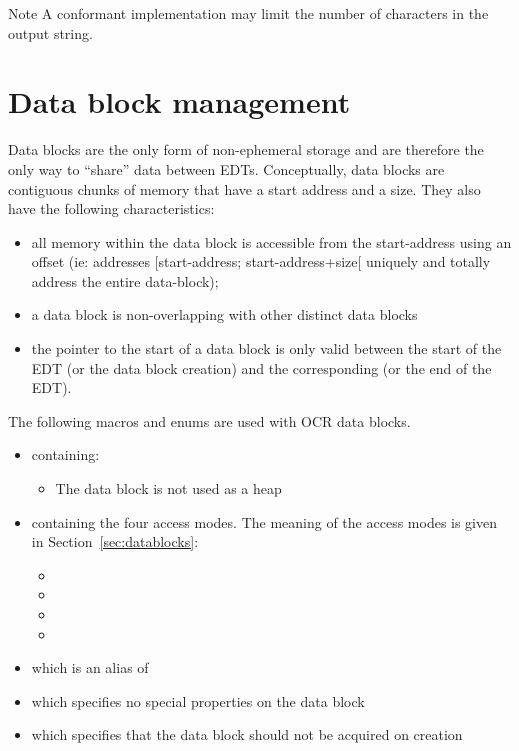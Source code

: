 \begin{DoxyNote}{Note}
A conformant implementation may limit the number of characters in the
output string.
\end{DoxyNote}
\section{Data block management}
\label{sec:OCRDataBlockManagement}

Data blocks are the only form of non-\/ephemeral storage and are therefore
the only way to ``share'' data between E\-D\-Ts. Conceptually, data blocks
are contiguous chunks of memory that have a start address and a size.
They also have the following characteristics\-:
\begin{itemize}
\item all memory within the data block is accessible from the start-\/address
  using an offset (ie\-: addresses \mbox{[}start-\/address; start-\/address+size\mbox{[}
  uniquely and totally address the entire data-\/block);
\item a data block is non-\/overlapping with other distinct data blocks
\item the pointer to the start of a data block is only valid between the start
of the E\-D\-T (or the data block creation) and the corresponding 
(or the end of the E\-D\-T).
\end{itemize}

The following macros and enums are used with OCR data blocks.
\begin{itemize}
\item \hypertarget{type_ocrInDbAllocator_t}{} containing:
  \begin{itemize}
  \item {} The data block is not used as a heap
  \end{itemize}
\item \hypertarget{type_ocrDbAccessMode_t}{}
  containing the four access modes. The
  meaning of the access modes is given in Section~\ref{sec:datablocks}:
  \begin{itemize}
    \item {}
    \item {}
    \item {}
    \item {}
  \end{itemize}
\item {} which is an alias of 
\item {} which specifies no special properties on the data block
\item {} which specifies that the data block should
  not be acquired on creation
\end{itemize}

